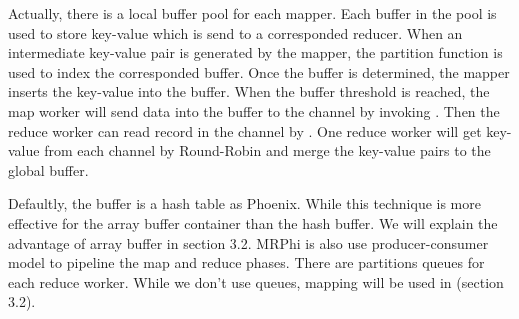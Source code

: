 Actually, there is a local buffer pool for each mapper.
Each buffer in the pool is used to store key-value 
which is send to a corresponded reducer.
When an intermediate key-value pair is generated by the mapper,
the partition function is used to index the corresponded buffer.
Once the buffer is determined, 
the mapper inserts the key-value into the buffer.
When the buffer threshold is reached,
the map worker will send data into the buffer to the channel by invoking .
Then the reduce worker can read record in the channel by .
One reduce worker will get key-value from each channel by Round-Robin and 
merge the key-value pairs to the global buffer.



Defaultly, the buffer is a hash table as Phoenix.
While this technique is more effective for the array buffer
container than the hash buffer. 
We will explain the advantage of array buffer in section 3.2.
MRPhi\cite{lu2013mrphi} is also use producer-consumer model to 
pipeline the map and reduce phases. 
There are partitions queues for each reduce worker.
While we don't use queues, mapping will be used in \myth(section 3.2).







